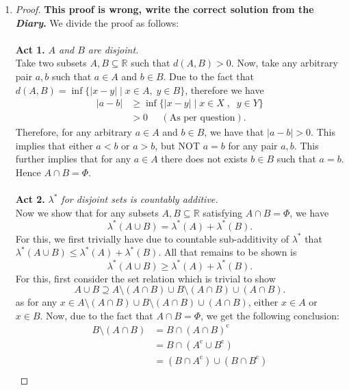 \documentclass{article}
\theoremstyle{definition}
\theoremstyle{remark}
\theoremstyle{definition}
\theoremstyle{definition}
\theoremstyle{definition}
\newcommand{\abs}[1]{\left \vert #1\right \vert}
\newcommand{\union}{\cup}
\newcommand{\intrs}{\cap}
\newcommand{\where}{\;\vert\;}
\newcommand{\R}{\mathbb{R}}
\newcommand{\comp}[1]{#1^{\text{c}}}
\newcommand{\lom}[1]{\lambda^*\left (#1\right )}
\begin{document}
\begin{enumerate}
{\begin{proof}
 \end{proof}}
\item {\begin{proof} \textbf{This proof is wrong, write the correct solution from the \emph{Diary}.} We divide the proof as follows:\\\\
		\textbf{Act 1.} \emph{$ A $ and $ B $ are disjoint.}\\
		Take two subsets $ A,B \subseteq \R $ such that $ d(A,B) >0 $. Now, take any arbitrary pair $ a,b $ such that $ a\in A $ and $ b\in B $. Due to the fact that $ d(A,B) = \inf \{\abs{x-y}\where x\in A, \;y\in B\}$, therefore we have
		\begin{equation*}
			\begin{split}
				\abs{a-b} &\ge \inf\{ \abs{x-y}\where x\in X\;,\;\;y\in Y\}\\
				&>0 \;\;\;\;\;(\text{As per question}).
			\end{split}
		\end{equation*}
	Therefore, for any arbitrary $ a\in A $ and $ b\in B $, we have that $ \abs{a-b} >0 $. This implies that either $ a < b $ or $ a > b $, but NOT $ a = b $ for any pair $ a,b$. This further implies that for any $ a\in A $ there does not exists $ b\in B $ such that $ a=b $. Hence $ A \intrs B  = \Phi$. \\\\
	\textbf{Act 2.} \emph{$ \lambda^* $ for disjoint sets is countably additive.}\\
	Now we show that for any subsets $ A, B\subseteq \R $ satisfying $ A\intrs B =\Phi $, we have
	\[\lom{A\union B} = \lom{A} + \lom{B}.\]
	For this, we first trivially have due to countable sub-additivity of $ \lambda^* $ that $ \lom{A \union B} \le \lom{A} + \lom{B} $. All that remains to be shown is 
	\[\lom{A\union B}\ge \lom{A} + \lom{B}.\]
	For this, first consider the set relation which is trivial to show
	\[A\union B \supseteq A\setminus (A\intrs B) \union B\setminus (A\intrs B) \union (A\intrs B).\]
	as for any $ x\in A\setminus (A\intrs B) \union B\setminus (A\intrs B) \union (A\intrs B) $, either $ x\in A $ or $ x\in B $. Now, due to the fact that $ A\intrs B = \Phi $, we get the following conclusion:
	\begin{equation*}
		\begin{split}
			 B\setminus (A\intrs B) &= B\intrs \comp{(A\intrs B)}\\
			 &= B\intrs (\comp{A} \union \comp{B})\\
			 &= (B\intrs \comp{A}) \union (B\intrs \comp{B})\\

\end{split}
\end{equation*}
\end{proof}}
\end{enumerate}
\end{document}
